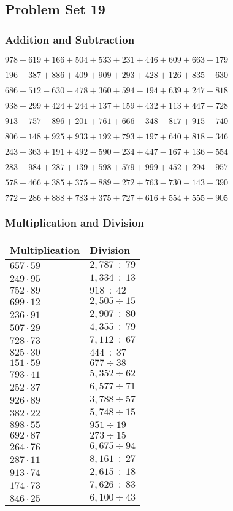 \hypertarget{problem-set-19-2}{%
\subsection{Problem Set 19}\label{problem-set-19-2}}

\hypertarget{addition-and-subtraction-119}{%
\subsubsection{Addition and
Subtraction}\label{addition-and-subtraction-119}}

\(978 + 619 + 166 + 504 + 533 + 231 + 446 + 609 + 663 + 179\)

\(196 + 387 + 886 + 409 + 909 + 293 + 428 + 126 + 835 + 630\)

\(686 + 512 - 630 - 478 + 360 + 594 - 194 + 639 + 247 - 818\)

\(938 + 299 + 424 + 244 + 137 + 159 + 432 + 113 + 447 + 728\)

\(913 + 757 - 896 + 201 + 761 + 666 - 348 - 817 + 915 - 740\)

\(806 + 148 + 925 + 933 + 192 + 793 + 197 + 640 + 818 + 346\)

\(243 + 363 + 191 + 492 - 590 - 234 + 447 - 167 + 136 - 554\)

\(283 + 984 + 287 + 139 + 598 + 579 + 999 + 452 + 294 + 957\)

\(578 + 466 + 385 + 375 - 889 - 272 + 763 - 730 - 143 + 390\)

\(772 + 286 + 888 + 783 + 375 + 727 + 616 + 554 + 555 + 905\)

\hypertarget{multiplication-and-division-119}{%
\subsubsection{Multiplication and
Division}\label{multiplication-and-division-119}}

\begin{longtable}[]{@{}ll@{}}
\toprule
Multiplication & Division\tabularnewline
\midrule
\endhead
\(657 \cdot 59\) & \(2,787÷79\)\tabularnewline
\(249 \cdot 95\) & \(1,334÷13\)\tabularnewline
\(752 \cdot 89\) & \(918÷42\)\tabularnewline
\(699 \cdot 12\) & \(2,505÷15\)\tabularnewline
\(236 \cdot 91\) & \(2,907÷80\)\tabularnewline
\(507 \cdot 29\) & \(4,355÷79\)\tabularnewline
\(728 \cdot 73\) & \(7,112÷67\)\tabularnewline
\(825 \cdot 30\) & \(444 ÷ 37\)\tabularnewline
\(151 \cdot 59\) & \(677÷38\)\tabularnewline
\(793 \cdot 41\) & \(5,352÷62\)\tabularnewline
\(252 \cdot 37\) & \(6,577÷71\)\tabularnewline
\(926 \cdot 89\) & \(3,788÷57\)\tabularnewline
\(382 \cdot 22\) & \(5,748÷15\)\tabularnewline
\(898 \cdot 55\) & \(951÷19\)\tabularnewline
\(692 \cdot 87\) & \(273÷15\)\tabularnewline
\(264 \cdot 76\) & \(6,675÷94\)\tabularnewline
\(287 \cdot 11\) & \(8,161÷27\)\tabularnewline
\(913 \cdot 74\) & \(2,615÷18\)\tabularnewline
\(174 \cdot 73\) & \(7,626÷83\)\tabularnewline
\(846 \cdot 25\) & \(6,100÷43\)\tabularnewline
\bottomrule
\end{longtable}

